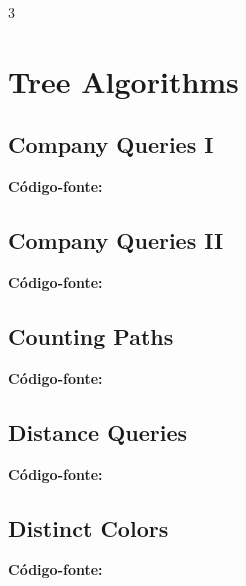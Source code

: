 \documentclass[8pt]{extarticle}
\begin{document}
\begin{multicols*}{3}

\section{Tree Algorithms}

\subsection{Company Queries I}
\begin{caixaenunciado}

\end{caixaenunciado}
\vspace{0.3cm}
\noindent\textbf{Código-fonte:}


\subsection{Company Queries II}
\begin{caixaenunciado}

\end{caixaenunciado}
\vspace{0.3cm}
\noindent\textbf{Código-fonte:}


\subsection{Counting Paths}
\begin{caixaenunciado}

\end{caixaenunciado}
\vspace{0.3cm}
\noindent\textbf{Código-fonte:}


\subsection{Distance Queries}
\begin{caixaenunciado}

\end{caixaenunciado}
\vspace{0.3cm}
\noindent\textbf{Código-fonte:}


\subsection{Distinct Colors}
\begin{caixaenunciado}

\end{caixaenunciado}
\vspace{0.3cm}
\noindent\textbf{Código-fonte:}



\end{multicols*}
\end{document}
